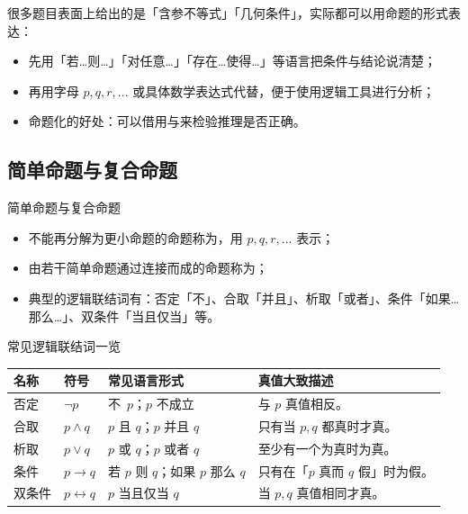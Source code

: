 \documentclass[a4paper,11pt]{ctexart}
\begin{document}
\begin{sideinfobox}[title={命题化技巧}]
  很多题目表面上给出的是「含参不等式」「几何条件」，实际都可以用命题的形式表达：
  \begin{itemize}
    \item 先用「若\ldots{}则\ldots{}」「对任意\ldots{}」「存在\ldots{}使得\ldots{}」等语言把条件与结论说清楚；
    \item 再用字母 $p,q,r,\dots$ 或具体数学表达式代替，便于使用逻辑工具进行分析；
    \item 命题化的好处：可以借用与来检验推理是否正确。
  \end{itemize}
\end{sideinfobox}

\subsection{简单命题与复合命题}

\begin{definitionbox}{简单命题与复合命题}
  \begin{itemize}
    \item 不能再分解为更小命题的命题称为，用 $p,q,r,\dots$ 表示；
    \item 由若干简单命题通过连接而成的命题称为；
    \item 典型的逻辑联结词有：否定「不」、合取「并且」、析取「或者」、条件「如果\ldots{}那么\ldots{}」、双条件「当且仅当」等。
  \end{itemize}
\end{definitionbox}

\begin{summarybox}{常见逻辑联结词一览}
  \begin{center}
  \begin{tabularx}{0.98\textwidth}{>{\raggedright\arraybackslash}p{2.6cm}>{\centering\arraybackslash}p{1.6cm}>{\raggedright\arraybackslash}p{3.1cm}X}
    \toprule
    \textbf{名称} & \textbf{符号} & \textbf{常见语言形式} & \textbf{真值大致描述} \\
    \midrule
    否定 & $\neg p$ & 不~$p$；$p$ 不成立 & 与 $p$ 真值相反。 \\
    合取 & $p\land q$ & $p$ 且 $q$；$p$ 并且 $q$ & 只有当 $p,q$ 都真时才真。 \\
    析取 & $p\lor q$ & $p$ 或 $q$；$p$ 或者 $q$ & 至少有一个为真时为真。 \\
    条件 & $p\to q$ & 若 $p$ 则 $q$；如果 $p$ 那么 $q$ & 只有在「$p$ 真而 $q$ 假」时为假。 \\
    双条件 & $p\leftrightarrow q$ & $p$ 当且仅当 $q$ & 当 $p,q$ 真值相同才真。 \\
    \bottomrule
  \end{tabularx}
  \end{center}
\end{summarybox}
\end{document}
